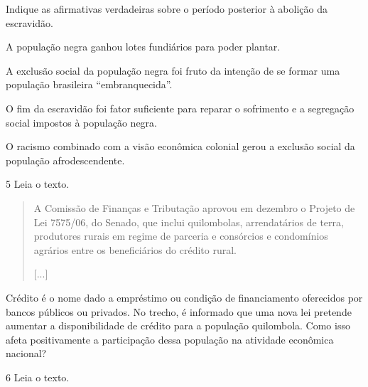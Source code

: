 Indique as afirmativas verdadeiras sobre o período posterior à abolição
da escravidão.

\begin{boxlist}
 A população negra ganhou lotes fundiários para poder plantar.

 A exclusão social da população negra foi fruto da intenção de se
formar uma população brasileira ``embranquecida''.

 O fim da escravidão foi fator suficiente para reparar o sofrimento e
a segregação social impostos à população negra.

 O racismo combinado com a visão econômica colonial gerou a exclusão
social da população afrodescendente.
\end{boxlist}

\num{5} Leia o texto.

\begin{quote}
A Comissão de Finanças e Tributação aprovou em dezembro o Projeto de Lei
7575/06, do Senado, que inclui quilombolas, arrendatários de terra,
produtores rurais em regime de parceria e consórcios e condomínios
agrários entre os beneficiários do crédito rural.

{[}...{]}

\end{quote}

Crédito é o nome dado a empréstimo ou condição de financiamento
oferecidos por bancos públicos ou privados. No trecho, é informado que
uma nova lei pretende aumentar a disponibilidade de crédito para a
população quilombola. Como isso afeta positivamente a participação dessa
população na atividade econômica nacional?


\num{6} Leia o texto.

